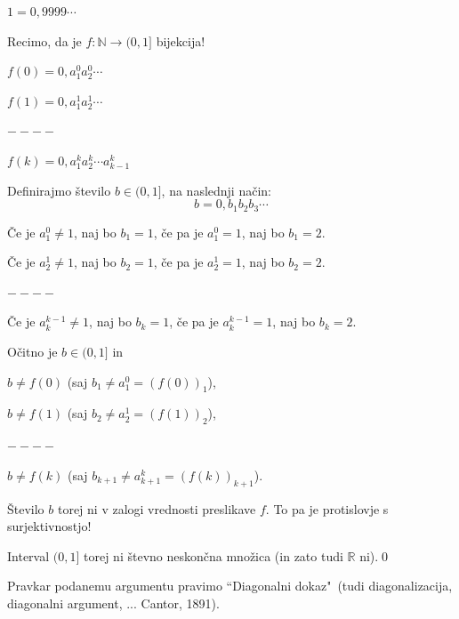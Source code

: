 \documentclass[11pt,paper=b5,footinclude,headinclude]{scrbook} %
\begin{document}
$1 = 0,9999\cdots$

Recimo, da je $f:\mathbb{N}\to (0,1]$ bijekcija!

$f(0) = 0,a_1^0a_2^0\cdots$

$f(1) = 0,a_1^1a_2^1\cdots$

$----$

$f(k) = 0,a_1^ka_2^k\cdots a^k_{k-1}$

Definirajmo število $b\in (0,1]$, na naslednji način:
$$b = 0,b_1b_2b_3\cdots$$

Če je $a_1^0 \neq 1$, naj bo $b_1 = 1$, če pa je $a_1^0 = 1$, naj bo $b_1 = 2$.

Če je $a_2^1 \neq 1$, naj bo $b_2 = 1$, če pa je $a_2^1 = 1$, naj bo $b_2 = 2$.

$----$

Če je $a_k^{k-1} \neq 1$, naj bo $b_k = 1$, če pa je $a_k^{k-1} = 1$, naj bo $b_k = 2$.

Očitno je $b\in (0,1]$ in

$b\neq f(0)$ (saj $b_1 \neq a^0_1 = (f(0))_1$),

$b\neq f(1)$ (saj $b_2 \neq a^1_2 = (f(1))_2$),

$----$

$b\neq f(k)$ (saj $b_{k+1} \neq a^{k}_{k+1} = (f(k))_{k+1}$).

Število $b$ torej ni v zalogi vrednosti preslikave $f$. To pa je protislovje s surjektivnostjo!

Interval $(0,1]$ torej ni števno neskončna množica (in zato tudi $\mathbb{R}$ ni).\qed

\medskip
Pravkar podanemu argumentu pravimo ``Diagonalni dokaz"~(tudi diagonalizacija, diagonalni argument, ...
Cantor, 1891).

\bigskip
\end{document}
